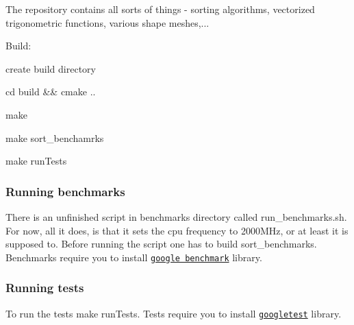 The repository contains all sorts of things -\/ sorting algorithms, vectorized trigonometric functions, various shape meshes,...

Build\+:
\begin{DoxyItemize}
\item create build directory
\item cd build \&\& cmake ..
\item make
\begin{DoxyItemize}
\item make sort\+\_\+benchamrks
\item make run\+Tests
\end{DoxyItemize}
\end{DoxyItemize}

\subsubsection*{Running benchmarks}

There is an unfinished script in benchmarks directory called run\+\_\+benchmarks.\+sh. For now, all it does, is that it sets the cpu frequency to 2000\+M\+Hz, or at least it is supposed to. Before running the script one has to build sort\+\_\+benchmarks. Benchmarks require you to install \href{https://github.com/google/benchmark}{\tt google benchmark} library.

\subsubsection*{Running tests}

To run the tests make run\+Tests. Tests require you to install \href{https://github.com/google/googletest}{\tt googletest} library. 